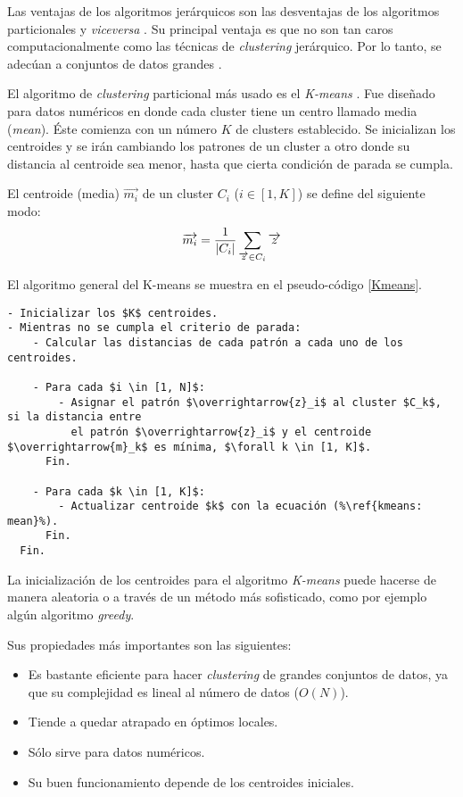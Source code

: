 Las ventajas de los algoritmos jerárquicos son las desventajas de los algoritmos
particionales y \emph{viceversa} \cite{PSO_0}. Su principal ventaja es que no
son tan caros computacionalmente como las técnicas de \emph{clustering}
jerárquico. Por lo tanto, se adecúan a conjuntos de datos grandes \cite{PSO_0}.

El algoritmo de \emph{clustering} particional más usado es el \emph{K-means} \cite{DC_4}. 
Fue diseñado para datos numéricos en donde cada cluster tiene un centro llamado
media (\emph{mean}). Éste comienza con un número $K$ de clusters establecido.
Se inicializan los centroides y se irán cambiando los patrones de un cluster
a otro donde su distancia al centroide sea menor, hasta que cierta condición de
parada se cumpla\cite{GePo2010}.

El centroide (media) $\overrightarrow{m_i}$ de un cluster $C_i$ ($i \in [1, K]$)
se define del siguiente modo:
\begin{equation} \label{kmeans: mean}
\overrightarrow{m_i} = {1 \over |C_{i}|} \sum_{\overrightarrow{z} \in C_{i}}\overrightarrow{z}
\end{equation}

El algoritmo general del K-means se muestra en el pseudo-código \ref{Kmeans}.

\begin{lstlisting}[float=!h, caption=Algoritmo General K-means\cite{GePo2010}, label=Kmeans]
- Inicializar los $K$ centroides.
- Mientras no se cumpla el criterio de parada:
    - Calcular las distancias de cada patrón a cada uno de los centroides.

    - Para cada $i \in [1, N]$:
        - Asignar el patrón $\overrightarrow{z}_i$ al cluster $C_k$, si la distancia entre
          el patrón $\overrightarrow{z}_i$ y el centroide $\overrightarrow{m}_k$ es mínima, $\forall k \in [1, K]$.
      Fin.

    - Para cada $k \in [1, K]$:
        - Actualizar centroide $k$ con la ecuación (%\ref{kmeans: mean}%).
      Fin.
  Fin.
\end{lstlisting}

La inicialización de los centroides para el algoritmo \emph{K-means} puede
hacerse de manera aleatoria o a través de un método más sofisticado, como por
ejemplo algún algoritmo \emph{greedy}.

Sus propiedades más importantes son las siguientes\cite{GePo2010}:
\begin{itemize}
    \item Es bastante eficiente para hacer \emph{clustering} de grandes conjuntos de datos,
ya que su complejidad es lineal al número de datos ($O(N)$).
    \item Tiende a quedar atrapado en óptimos locales.
    \item Sólo sirve para datos numéricos.
    \item Su buen funcionamiento depende de los centroides iniciales.
\end{itemize}

